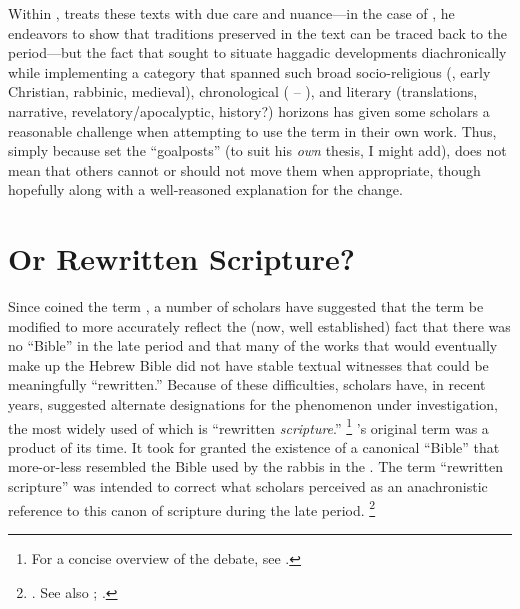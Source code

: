 Within , \vermes treats these texts with due care and nuance---in the case of \sefer, he endeavors to show that traditions preserved in the text can be traced back to the \secondtemple period---but the fact that \vermes sought to situate haggadic developments diachronically while implementing a category that spanned such broad socio-religious (\qumran, early Christian, rabbinic, medieval), chronological ( -- ), and literary (translations, narrative, revelatory/apocalyptic, history?) horizons has given some scholars a reasonable challenge when attempting to use the term in their own work. Thus, simply because \vermes set the ``goalposts'' (to suit his \emph{own} thesis, I might add), does not mean that others cannot or should not move them when appropriate, though hopefully along with a well-reasoned explanation for the change. 

\section{\rwb Or Rewritten Scripture?}

Since \vermes coined the term \rwb, a number of scholars have suggested that the term be modified to more accurately reflect the (now, well established) fact that there was no ``Bible'' in the late \secondtemple period and that many of the works that would eventually make up the Hebrew Bible did not have stable textual witnesses that could be meaningfully ``rewritten.'' Because of these difficulties, scholars have, in recent years, suggested alternate designations for the phenomenon under investigation, the most widely used of which is ``rewritten \emph{scripture}.''%
    \footnote{%
        For a concise overview of the debate, see
        \cite{zahn_weissenberg-pakkala2011}.}
\vermes's original term \rwb was a product of its time. It took for granted the existence of a canonical ``Bible'' that more-or-less resembled the Bible used by the rabbis in the . The term ``rewritten scripture'' was intended to correct what scholars perceived as an anachronistic reference to this canon of scripture during the late \secondtemple period.%
    \footnote{%
        \Cite[58--59]{campbell_zsengeller2014}. See also
        \cite{ulrich_mcdonald-sanders2002}; 
        \cite{ulrich_zsengeller2014}.}

